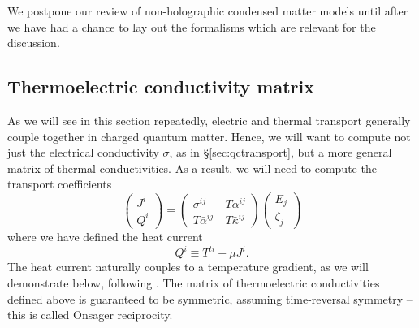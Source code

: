 \documentclass[10pt, oneside]{book}
\begin{document}
\begin{doublespace}
We postpone our review of non-holographic condensed matter models until after we have had a chance to lay out the formalisms which are relevant for the discussion.

\subsection{Thermoelectric conductivity matrix}
As we will see in this section repeatedly, electric and thermal transport generally couple together in charged quantum matter.   Hence, we will want to compute not just the electrical conductivity $\sigma$, as in \S\ref{sec:qctransport}, but a more general matrix of thermal conductivities.    As a result, we will need to compute the transport coefficients \begin{equation}
\left(\begin{array}{c} J^i \\ Q^i  \end{array}\right) = \left(\begin{array}{cc} \sigma^{ij} &\ T\alpha^{ij} \\ T\bar\alpha^{ij} &\ T \bar\kappa^{ij} \end{array}\right) \left(\begin{array}{c} E_j \\ \zeta_j  \end{array}\right)  \label{eq:thermoelectric}
\end{equation} 
where we have defined the heat current \begin{equation}
Q^i \equiv T^{ti} - \mu J^i.
\end{equation}
The heat current naturally couples to a temperature gradient, as we will demonstrate below, following \cite{Hartnoll:2009sz}.   The matrix of thermoelectric conductivities defined above is guaranteed to be  symmetric, assuming time-reversal symmetry -- this is called Onsager reciprocity.


\end{doublespace}
\end{document}
